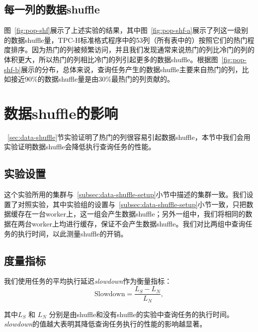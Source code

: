 \subsection{每一列的数据shuffle}

\par 图~\ref{fig:pop-shf}展示了上述实验的结果，其中图~\ref{fig:pop-shf-a}展示了列这一级别的数据shuffle量，TPC-H标准格式程序中的53列（所有表中的）按照它们的热门程度排序。因为热门的列被频繁访问，并且我们发现通常来说热门的列比冷门的列的体积更大，所以热门的列相比冷门的列引起更多的数据shuffle。根据图~\ref{fig:pop-shf-b}展示的分布，总体来说，查询任务产生的数据shuffle主要来自热门的列，比如接近90\%的数据shuffle量是由30\%最热门的列贡献的。

\section{数据shuffle的影响}
\label{sec:shuffle-impact}

\par ~\ref{sec:data-shuffle}节实验证明了热门的列很容易引起数据shuffle，本节中我们会用实验证明数据shuffle会降低执行查询任务的性能。

\subsection{实验设置}
\label{subsec:shuffle-impact-setup}

\par 这个实验所用的集群与~\ref{subsec:data-shuffle-setup}小节中描述的集群一致。我们设置了对照实验，其中实验组的设置与~\ref{subsec:data-shuffle-setup}小节一致，只把数据缓存在一台worker上，这一组会产生数据shuffle；另外一组中，我们将相同的数据在两台worker上均进行缓存，保证不会产生数据shuffle。我们对比两组中查询任务的执行时间，以此测量shuffle的开销。

\subsection{度量指标}
\label{subsec:shuffle-impact-metrics}

\par 我们使用任务的平均执行延迟\emph{slowdown}作为衡量指标：
\begin{equation}
    \text{Slowdown} = \frac{L_S - L_N}{L_N},
\end{equation}

\par 其中$L_S$ 和 $L_N$ 分别是由shuffle和没有shuffle的实验中查询任务的执行时间。\emph{slowdown}的值越大表明其降低查询任务执行的性能的影响越显著。

